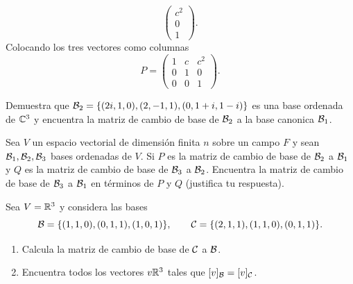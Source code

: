 \documentclass[12pt,a4paper]{article}
\begin{document}
\begin{solucion}
\begin{equation*}
\begin{pmatrix}
                c^{2}\\
                0\\
                1
            \end{pmatrix}.
        \end{equation*}
        Colocando los tres vectores como columnas
        \begin{equation*}
            P=
            \begin{pmatrix}
                1 & c & c^{2}\\
                0 & 1 & 0\\
                0 & 0 & 1
            \end{pmatrix}.
        \end{equation*}
    \end{solucion}

    \begin{mdframed}[style=mdbluebox,frametitle={Ejercicio 4}]
        Demuestra que $\mathcal{B}_{2}=\{(2i,1,0),(2,-1,1),(0,1+i,1-i)\}$ es una base ordenada de $\mathbb{C}^{3}$ y encuentra la matriz de cambio de base
        de $\mathcal{B}_{2}$ a la base canonica $\mathcal{B}_{1}$.
    \end{mdframed}

    \begin{mdframed}[style=mdbluebox,frametitle={Ejercicio 5}]
        Sea $V$ un espacio vectorial de dimensión finita $n$ sobre un campo $F$ y sean $\mathcal{B}_{1},\mathcal{B}_{2},\mathcal{B}_{3}$ bases ordenadas de $V$. Si $P$ es la matriz de cambio de base de $\mathcal{B}_{2}$ a
        $\mathcal{B}_{1}$ y $Q$ es la matriz de cambio de base de $\mathcal{B}_{3}$ a $\mathcal{B}_{2}$. Encuentra la matriz de cambio de base de $\mathcal{B}_{3}$ a $\mathcal{B}_{1}$ en términos de $P$ y $Q$ (justifica tu respuesta).
    \end{mdframed}

    \begin{mdframed}[style=mdbluebox,frametitle={Ejercicio 6}]
        Sea $V=\mathbb{R}^{3}$ y considera las bases
        \begin{equation*}
            \mathcal{B}=\{(1,1,0),(0,1,1),(1,0,1)\},\qquad \mathcal{C}=\{(2,1,1),(1,1,0),(0,1,1)\}.
        \end{equation*}
        \begin{enumerate}
            \item[(a)] Calcula la matriz de cambio de base de $\mathcal{C}$ a $\mathcal{B}$.
            \item[(b)] Encuentra todos los vectores $v\mathbb{R}^{3}$ tales que $[v]_{\mathcal{B}}=[v]_{\mathcal{C}}$.
        \end{enumerate}
    \end{mdframed}
\end{document}
